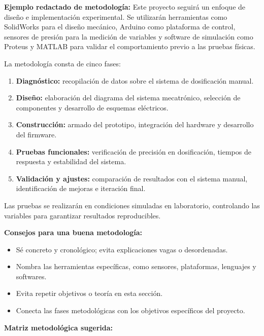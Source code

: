 \documentclass[12pt,letterpaper]{report}
\begin{document}
\begin{instrucciones}

\noindent \textbf{Ejemplo redactado de metodología:} Este proyecto seguirá un enfoque de diseño e implementación experimental. Se utilizarán herramientas como SolidWorks para el diseño mecánico, Arduino como plataforma de control, sensores de presión para la medición de variables y software de simulación como Proteus y MATLAB para validar el comportamiento previo a las pruebas físicas.

\vspace{2mm}
\noindent La metodología consta de cinco fases:
\begin{enumerate}
  \item \textbf{Diagnóstico:} recopilación de datos sobre el sistema de dosificación manual.
  \item \textbf{Diseño:} elaboración del diagrama del sistema mecatrónico, selección de componentes y desarrollo de esquemas eléctricos.
  \item \textbf{Construcción:} armado del prototipo, integración del hardware y desarrollo del firmware.
  \item \textbf{Pruebas funcionales:} verificación de precisión en dosificación, tiempos de respuesta y estabilidad del sistema.
  \item \textbf{Validación y ajustes:} comparación de resultados con el sistema manual, identificación de mejoras e iteración final.
\end{enumerate}

\noindent Las pruebas se realizarán en condiciones simuladas en laboratorio, controlando las variables para garantizar resultados reproducibles.

\vspace{2mm}
\noindent \textbf{Consejos para una buena metodología:}
\begin{itemize}
  \item Sé concreto y cronológico; evita explicaciones vagas o desordenadas.
  \item Nombra las herramientas específicas, como sensores, plataformas, lenguajes y softwares.
  \item Evita repetir objetivos o teoría en esta sección.
  \item Conecta las fases metodológicas con los objetivos específicos del proyecto.
\end{itemize}

\vspace{2mm}
\noindent \textbf{Matriz metodológica sugerida:}


\end{instrucciones}
\end{document}
